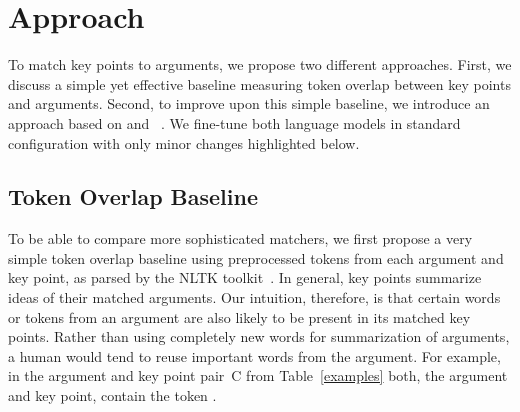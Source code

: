 \section{Approach}\label{approach}

To match key points to arguments, we propose two different approaches.
First, we discuss a simple yet effective baseline measuring token overlap between key points and arguments.
Second, to improve upon this simple baseline, we introduce an approach based on \Bert and \Roberta~\cite{DevlinCLT2019,LiuOGDJCLLZS2019}. 
We fine-tune both language models in standard configuration with only minor changes highlighted below.

\subsection{Token Overlap Baseline}
To be able to compare more sophisticated matchers, we first propose a very simple token overlap baseline using preprocessed tokens 
from each argument and key point, as parsed by the NLTK toolkit~\cite{BirdL2004}. 
In general, key points summarize ideas of their matched arguments.
Our intuition, therefore, is that certain words or tokens from an argument are also likely to be present in its matched key points. 
Rather than using completely new words for summarization of arguments, a human would tend to reuse important words from the argument.
For example, in the argument and key point pair~C from Table~\ref{examples} both, the argument and key point, contain the token .

